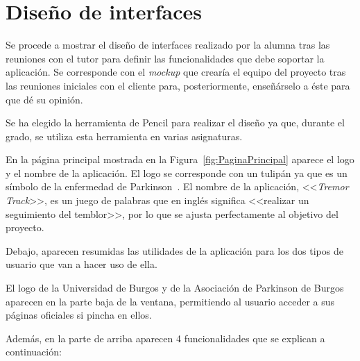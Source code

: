 \section{Diseño de interfaces}
Se procede a mostrar el diseño de interfaces realizado por la alumna tras las reuniones con el tutor para definir las funcionalidades que debe soportar la aplicación. Se corresponde con el \textit{mockup} que crearía el equipo del proyecto tras las reuniones iniciales con el cliente para, posteriormente, enseñárselo a éste para que dé su opinión.

Se ha elegido la herramienta de Pencil para realizar el diseño ya que, durante el grado, se utiliza esta herramienta en varias asignaturas. 

En la página principal mostrada en la Figura~\ref{fig:PaginaPrincipal} aparece el logo y el nombre de la aplicación. El logo se corresponde con un tulipán ya que es un símbolo de la enfermedad de Parkinson~\cite{tulipan}. El nombre de la aplicación, <<\textit{Tremor Track}>>, es un juego de palabras que en inglés significa <<realizar un seguimiento del temblor>>, por lo que se ajusta perfectamente al objetivo del proyecto.

Debajo, aparecen resumidas las utilidades de la aplicación para los dos tipos de usuario que van a hacer uso de ella. 

El logo de la Universidad de Burgos y de la Asociación de Parkinson de Burgos aparecen en la parte baja de la ventana, permitiendo al usuario acceder a sus páginas oficiales si pincha en ellos. 


Además, en la parte de arriba aparecen 4 funcionalidades que se explican a continuación: 

